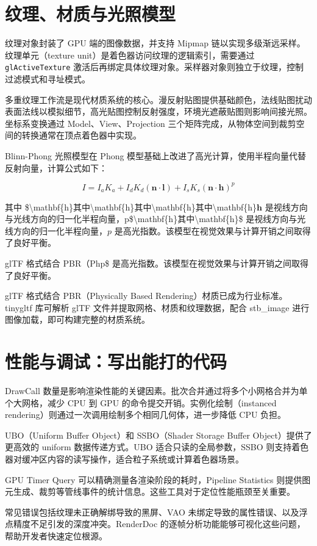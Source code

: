 \chapter{纹理、材质与光照模型}
纹理对象封装了 GPU 端的图像数据，并支持 Mipmap 链以实现多级渐远采样。纹理单元（texture unit）是着色器访问纹理的逻辑索引，需要通过 \texttt{glActiveTexture} 激活后再绑定具体纹理对象。采样器对象则独立于纹理，控制过滤模式和寻址模式。\par
多重纹理工作流是现代材质系统的核心。漫反射贴图提供基础颜色，法线贴图扰动表面法线以模拟细节，高光贴图控制反射强度，环境光遮蔽贴图则影响间接光照。坐标系变换通过 Model、View、Projection 三个矩阵完成，从物体空间到裁剪空间的转换通常在顶点着色器中实现。\par
Blinn-Phong 光照模型在 Phong 模型基础上改进了高光计算，使用半程向量代替反射向量，计算公式如下：\par
$$ I = I_a K_a + I_d K_d (\mathbf{n} \cdot \mathbf{l}) + I_s K_s (\mathbf{n} \cdot \mathbf{h})^p $$\par
其中 \${}\textbackslash{}mathbf\{{}h\}{}$其中 $\textbackslash{}mathbf\{{}h\}{}$其中 $\textbackslash{}mathbf\{{}h\}{}$其中 $\textbackslash{}mathbf\{{}h\}{}$\mathbf{h}$ 是视线方向与光线方向的归一化半程向量，p\${}\textbackslash{}mathbf\{{}h\}{}$ 其中 $\textbackslash{}mathbf\{{}h\}{}\${} 是视线方向与光线方向的归一化半程向量，$p$ 是高光指数。该模型在视觉效果与计算开销之间取得了良好平衡。\par
glTF 格式结合 PBR（Php\${} 是高光指数。该模型在视觉效果与计算开销之间取得了良好平衡。\par
glTF 格式结合 PBR（Physically Based Rendering）材质已成为行业标准。tinygltf 库可解析 glTF 文件并提取网格、材质和纹理数据，配合 stb\_{}image 进行图像加载，即可构建完整的材质系统。\par
\chapter{性能与调试：写出能打的代码}
DrawCall 数量是影响渲染性能的关键因素。批次合并通过将多个小网格合并为单个大网格，减少 CPU 到 GPU 的命令提交开销。实例化绘制（instanced rendering）则通过一次调用绘制多个相同几何体，进一步降低 CPU 负担。\par
UBO（Uniform Buffer Object）和 SSBO（Shader Storage Buffer Object）提供了更高效的 uniform 数据传递方式。UBO 适合只读的全局参数，SSBO 则支持着色器对缓冲区内容的读写操作，适合粒子系统或计算着色器场景。\par
GPU Timer Query 可以精确测量各渲染阶段的耗时，Pipeline Statistics 则提供图元生成、裁剪等管线事件的统计信息。这些工具对于定位性能瓶颈至关重要。\par
常见错误包括纹理未正确解绑导致的黑屏、VAO 未绑定导致的属性错误、以及浮点精度不足引发的深度冲突。RenderDoc 的逐帧分析功能能够可视化这些问题，帮助开发者快速定位根源。\par
